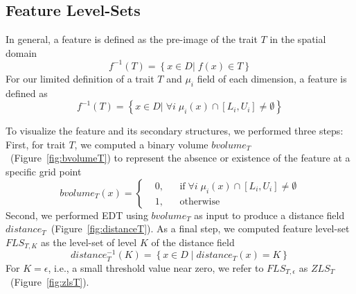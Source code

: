 \vspace{-2mm}
\subsection{Feature Level-Sets}
\label{sec:fls}
In general, a feature is defined as the pre-image of the trait $T$ in the spatial domain
\begin{equation}
f^{-1}(T) = \left\{ x \in D |\; f(x) \in T \right\}
\end{equation}
%
For our limited definition of a trait $T$ and ${\mu}_{i}$ field of each dimension, a feature is defined as 
\begin{equation}
f^{-1}(T) = \left\{ x \in D |\; \forall i\;{\mu}_{i}(x) \cap [L_{i}, U_{i}] \neq \emptyset\right\}
\end{equation}





To visualize the feature and its secondary structures, we performed three steps:
%
First, for trait $T$, we computed a binary volume $bvolume_{T}$~(Figure~\ref{fig:bvolumeT}) to represent the absence or existence of the feature at a specific grid point
%
\begin{equation}
  bvolume_{T}(x) = \left \{
  \begin{aligned}
    &0, && \text{if}\; \forall i\; {\mu}_{i}(x) \cap [L_{i}, U_{i}] \neq \emptyset \\
    &1, && \text{otherwise}
  \end{aligned} \right.
\end{equation}
%
Second, we performed EDT using $bvolume_{T}$ as input to produce a distance field $distance_{T}$~(Figure~\ref{fig:distanceT}). 
%
%
As a final step, we computed feature level-set $FLS_{T,K}$ as the level-set of level $K$ of the distance field
%
\begin{equation} 
distance_{T}^{-1}(K) = \left\{ x \in D\; |\; distance_{T}(x) = K\right\}
\end{equation}
%
%
For $K = \epsilon$, i.e., a small threshold value near zero, we refer to $FLS_{T,\epsilon}$ as $ZLS_{T}$~(Figure~\ref{fig:zlsT}).
%
%

